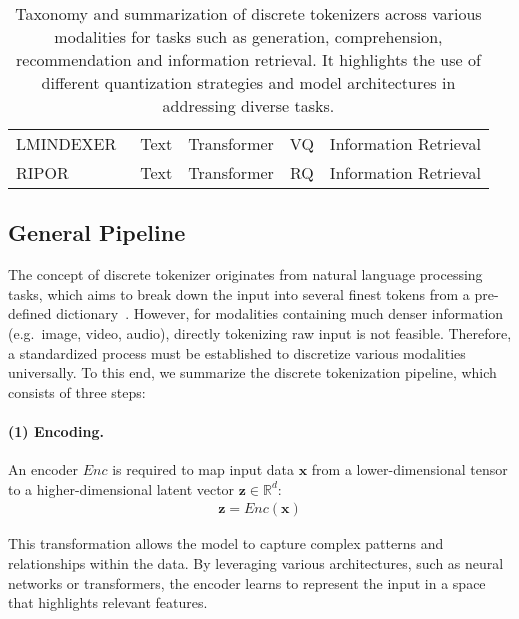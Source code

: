 \begin{table*}[h!]
{\begin{tabular}{l|c|c|c|c}
LMINDEXER~\cite{jin2023language} & Text & Transformer & VQ & Information Retrieval \\
RIPOR~\cite{zeng2024scalable} & Text & Transformer & RQ & Information Retrieval \\
\bottomrule
\end{tabular}
}
\vspace{-3mm}
\caption{
Taxonomy and summarization of discrete tokenizers across various modalities for tasks such as generation, comprehension, recommendation and information retrieval. 
It highlights the use of different quantization strategies and model architectures in addressing diverse tasks.
}
\vspace{-3mm}
\end{table*}



\subsection{General Pipeline}
\label{sec:procedure}



The concept of discrete tokenizer originates from natural language processing tasks, which aims to break down the input into several finest tokens from a pre-defined dictionary~\cite{bpe2016}.
However, for modalities containing much denser information (e.g.\ image, video, audio), directly tokenizing raw input is not feasible. 
Therefore, a standardized process must be established to discretize various modalities universally.
To this end, we summarize the discrete tokenization pipeline, which consists of three steps:


\paragraph{(1) Encoding.}
An encoder $Enc$ is required to map input data $\boldsymbol{x}$ from a lower-dimensional tensor to a higher-dimensional latent vector $\boldsymbol{z} \in \mathbb{R}^{d}$:
\begin{equation}\label{equ:encoding}
\begin{gathered}
    \boldsymbol{z} = Enc(\boldsymbol{x})
\end{gathered}
\end{equation}

This transformation allows the model to capture complex patterns and relationships within the data. 
By leveraging various architectures, such as neural networks or transformers, the encoder learns to represent the input in a space that highlights relevant features.



